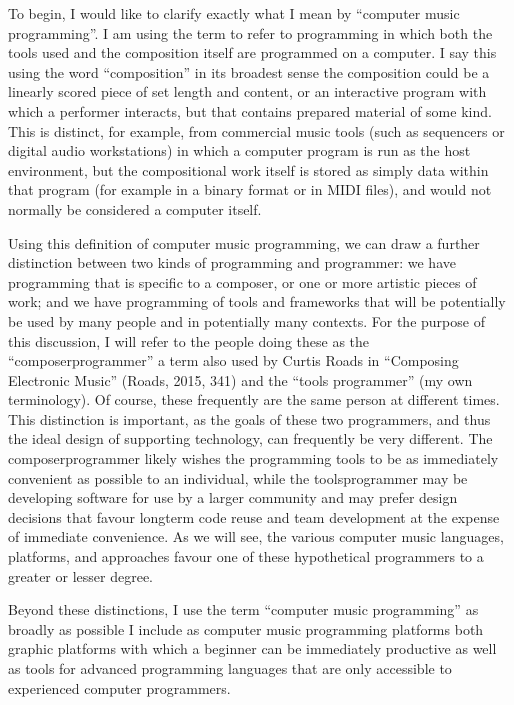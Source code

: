 \documentclass[letterpaper,10pt,english]{sphinxmanual}
\begin{document}
\sphinxAtStartPar
To begin, I would like to clarify exactly what I mean by “computer music programming”.
I am using the term to refer to programming in which both the tools used and the composition itself
are programmed on a computer.
I say this using the word “composition” in its broadest sense \sphinxhyphen{} the composition could
be a linearly scored piece of set length and content, or an interactive program with which
a performer interacts, but that contains prepared material of some kind.
This is distinct, for example, from commercial music tools (such as sequencers or digital
audio workstations) in which a computer program is run as the host environment, but the compositional
work itself is stored as simply data within that program (for example in a binary format or
in MIDI files), and would not normally be considered a computer  itself.

\sphinxAtStartPar
Using this definition of computer music programming, we can draw a further distinction
between two kinds of programming and programmer:
we have programming that is specific to a composer, or one or more artistic pieces of work;
and we have programming of tools and frameworks that will be potentially be used by many
people and in potentially many contexts.
For the purpose of this discussion, I will refer to the people doing these as the “composer\sphinxhyphen{}programmer”
\sphinxhyphen{} a term also used by Curtis Roads in “Composing Electronic Music” (Roads, 2015, 341) \sphinxhyphen{}
and the “tools programmer” (my own terminology).
Of course, these frequently are the same person at different times.
This distinction is important, as the goals of these two programmers, and thus the
ideal design of supporting technology, can frequently be very different.
The composer\sphinxhyphen{}programmer likely wishes the programming tools to be as immediately convenient as possible to
an individual, while the tools\sphinxhyphen{}programmer may be
developing software for use by a larger community and may prefer design decisions
that favour long\sphinxhyphen{}term code reuse and team development at the expense of immediate convenience.
As we will see, the various computer music languages, platforms, and approaches
favour one of these hypothetical programmers to a greater or lesser degree.

\sphinxAtStartPar
Beyond these distinctions, I use the term “computer music programming” as broadly
as possible \sphinxhyphen{} I include as computer music programming platforms both graphic platforms with
which a beginner can be immediately productive as well as tools for advanced programming
languages that are only accessible to experienced computer programmers.
\end{document}
